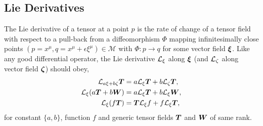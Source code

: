 \subsection{Lie Derivatives}\label{intro:sec:lie_deriv}

The Lie derivative of a tensor at a point $p$ is the rate of change of a tensor field with respect to a pull-back from a diffeomorphism $\Phi$ mapping infinitesimally close points $(p=x^\mu,q= x^\mu+\epsilon \xi^\mu) \in \mathcal{M}$ with $\Phi:p \rightarrow q $ for some vector field $\boldsymbol{\xi}$. Like any good differential operator, the Lie derivative $\mathcal{L}_\xi$ along $\boldsymbol{\xi}$ (and $\mathcal{L}_\zeta$ along vector field $\boldsymbol{\zeta}$) should obey,
\begin{align}
\mathcal{L}_{a \xi + b \zeta}\boldsymbol{T}  &= a \mathcal{L}_\xi\boldsymbol{T}  + b \mathcal{L}_\zeta\boldsymbol{T} ,\\
\mathcal{L}_\xi (a \boldsymbol{T} + b \boldsymbol{W}) & = a \mathcal{L}_\xi \boldsymbol{T} + b \mathcal{L}_\xi \boldsymbol{W} , \\
\mathcal{L}_\xi (f \boldsymbol{T} ) &= \boldsymbol{T} \mathcal{L}_\xi f + f \mathcal{L}_\xi \boldsymbol{T} \label{intro:eq:lie_liebnitz},
\end{align}
for constant $\{a,b\}$, function $f$ and generic tensor fields $\boldsymbol{T}$ and $\boldsymbol{W}$ of same rank. 

